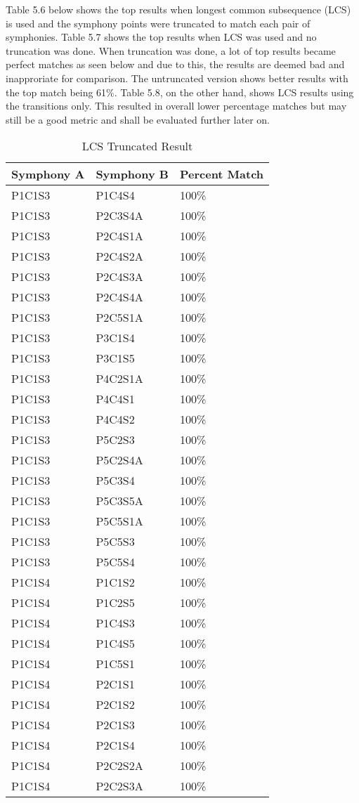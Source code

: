 Table 5.6 below shows the top results when longest common subsequence (LCS) is used and the symphony points were truncated to match each pair of symphonies. Table 5.7 shows the top results when LCS was used and no truncation was done. When truncation was done, a lot of top results became perfect matches as seen below and due to this, the results are deemed bad and inapproriate for comparison. The untruncated version shows better results with the top match being 61\%. Table 5.8, on the other hand, shows LCS results using the transitions only. This resulted in overall lower percentage matches but may still be a good metric and shall be evaluated further later on.

\begin{longtable}{|l|l|l|}
\caption{LCS Truncated Result}
\label{my-label}\\
\hline
Symphony A & Symphony B & Percent Match \\ \hline
\endfirsthead
%
\endhead
%
P1C1S3 & P1C4S4 & 100\% \\ \hline
P1C1S3 & P2C3S4A & 100\% \\ \hline
P1C1S3 & P2C4S1A & 100\% \\ \hline
P1C1S3 & P2C4S2A & 100\% \\ \hline
P1C1S3 & P2C4S3A & 100\% \\ \hline
P1C1S3 & P2C4S4A & 100\% \\ \hline
P1C1S3 & P2C5S1A & 100\% \\ \hline
P1C1S3 & P3C1S4 & 100\% \\ \hline
P1C1S3 & P3C1S5 & 100\% \\ \hline
P1C1S3 & P4C2S1A & 100\% \\ \hline
P1C1S3 & P4C4S1 & 100\% \\ \hline
P1C1S3 & P4C4S2 & 100\% \\ \hline
P1C1S3 & P5C2S3 & 100\% \\ \hline
P1C1S3 & P5C2S4A & 100\% \\ \hline
P1C1S3 & P5C3S4 & 100\% \\ \hline
P1C1S3 & P5C3S5A & 100\% \\ \hline
P1C1S3 & P5C5S1A & 100\% \\ \hline
P1C1S3 & P5C5S3 & 100\% \\ \hline
P1C1S3 & P5C5S4 & 100\% \\ \hline
P1C1S4 & P1C1S2 & 100\% \\ \hline
P1C1S4 & P1C2S5 & 100\% \\ \hline
P1C1S4 & P1C4S3 & 100\% \\ \hline
P1C1S4 & P1C4S5 & 100\% \\ \hline
P1C1S4 & P1C5S1 & 100\% \\ \hline
P1C1S4 & P2C1S1 & 100\% \\ \hline
P1C1S4 & P2C1S2 & 100\% \\ \hline
P1C1S4 & P2C1S3 & 100\% \\ \hline
P1C1S4 & P2C1S4 & 100\% \\ \hline
P1C1S4 & P2C2S2A & 100\% \\ \hline
P1C1S4 & P2C2S3A & 100\% \\ \hline
\end{longtable}


